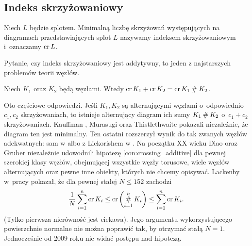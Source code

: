 \subsection{Indeks skrzyżowaniowy}
%
\label{sub:crossing_number}%
\begin{definition}
    Niech $L$ będzie splotem.
    Minimalną liczbę skrzyżowań występujących na diagramach przedstawiających splot $L$ nazywamy indeksem skrzyżowaniowym i~oznaczamy $\operatorname{cr} L$.
\end{definition}

Pytanie, czy indeks skrzyżowaniowy jest addytywny, to jeden z najstarszych problemów teorii węzłów.

\begin{conjecture}
%
\label{con:crossing_additive}%
    Niech $K_1$ oraz $K_2$ będą węzłami.
    Wtedy $\operatorname{cr} K_1 + \operatorname{cr} K_2 = \operatorname{cr} K_1 \mathbin{\#} K_2$.
\end{conjecture}

Oto częściowe odpowiedzi.
Jeśli $K_1, K_2$ są alternującymi węzłami o~odpowiednio $c_1, c_2$ skrzyżowaniach, to istnieje alternujący diagram ich sumy $K_1 \mathbin{\#} K_2$ o~$c_1 + c_2$ skrzyżowaniach.
%
Kauffman \cite[twierdzenie 2.10]{kauffman87}, Murasugi \cite[wniosek 6]{murasugi87} oraz Thistlethwaite \cite[wniosek 1]{thistlethwaite87} pokazali niezależnie, że diagram ten jest minimalny.
Ten ostatni rozszerzył wynik do tak zwanych węzłów adekwatnych: sam w \cite{thistlethwaite88} albo z Lickorishem w \cite{lickorish88}.
%
Na początku XX wieku Diao \cite{diao04} oraz Gruber \cite{gruber03} niezależnie udowodnili hipotezę \ref{con:crossing_additive} dla pewnej szerokiej klasy węzłów, obejmującej wszystkie węzły torusowe, wiele węzłów alternujących oraz pewne inne obiekty, których nie chcemy opisywać.
%
Lackenby w~pracy \cite{lackenby09} pokazał, że dla pewnej stałej $N \le 152$ zachodzi
\begin{equation}
    \frac 1 N \sum_{i=1}^n \operatorname{cr}{K_i} \le \operatorname{cr} \left(\operatorname*{\#}_{i=1}^n K_i\right) \le \sum_{i=1}^n \operatorname{cr}{K_i}.
\end{equation}
(Tylko pierwsza nierówność jest ciekawa).
Jego argumentu wykorzystującego powierzchnie normalne nie można poprawić tak, by otrzymać stałą $N = 1$.
Jednocześnie od 2009 roku nie widać postępu nad hipotezą.

%

